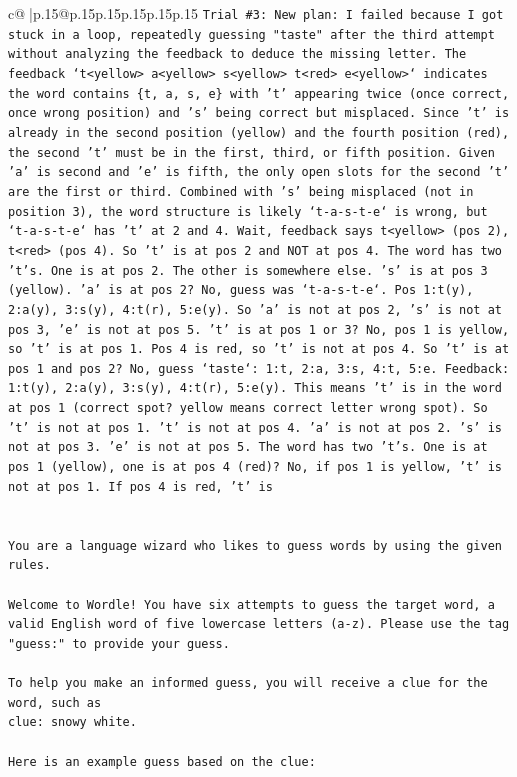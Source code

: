 \documentclass{article}
\begin{document}
{\begin{supertabular}{c@{$\;$}|p{.15\linewidth}@{}p{.15\linewidth}p{.15\linewidth}p{.15\linewidth}p{.15\linewidth}p{.15\linewidth}}
{{{\texttt{Trial \#3: New plan: I failed because I got stuck in a loop, repeatedly guessing "taste" after the third attempt without analyzing the feedback to deduce the missing letter. The feedback `t<yellow> a<yellow> s<yellow> t<red> e<yellow>` indicates the word contains \{t, a, s, e\} with 't' appearing twice (once correct, once wrong position) and 's' being correct but misplaced. Since 't' is already in the second position (yellow) and the fourth position (red), the second 't' must be in the first, third, or fifth position. Given 'a' is second and 'e' is fifth, the only open slots for the second 't' are the first or third. Combined with 's' being misplaced (not in position 3), the word structure is likely `t{-}a{-}s{-}t{-}e` is wrong, but `t{-}a{-}s{-}t{-}e` has 't' at 2 and 4. Wait, feedback says t<yellow> (pos 2), t<red> (pos 4). So 't' is at pos 2 and NOT at pos 4. The word has two 't's. One is at pos 2. The other is somewhere else. 's' is at pos 3 (yellow). 'a' is at pos 2? No, guess was `t{-}a{-}s{-}t{-}e`. Pos 1:t(y), 2:a(y), 3:s(y), 4:t(r), 5:e(y). So 'a' is not at pos 2, 's' is not at pos 3, 'e' is not at pos 5. 't' is at pos 1 or 3? No, pos 1 is yellow, so 't' is at pos 1. Pos 4 is red, so 't' is not at pos 4. So 't' is at pos 1 and pos 2? No, guess `taste`: 1:t, 2:a, 3:s, 4:t, 5:e. Feedback: 1:t(y), 2:a(y), 3:s(y), 4:t(r), 5:e(y). This means 't' is in the word at pos 1 (correct spot? yellow means correct letter wrong spot). So 't' is not at pos 1. 't' is not at pos 4. 'a' is not at pos 2. 's' is not at pos 3. 'e' is not at pos 5. The word has two 't's. One is at pos 1 (yellow), one is at pos 4 (red)? No, if pos 1 is yellow, 't' is not at pos 1. If pos 4 is red, 't' is} \\
\\ 
\\ 
\texttt{You are a language wizard who likes to guess words by using the given rules.} \\
\\ 
\texttt{Welcome to Wordle! You have six attempts to guess the target word, a valid English word of five lowercase letters (a{-}z). Please use the tag "guess:" to provide your guess.} \\
\\ 
\texttt{To help you make an informed guess, you will receive a clue for the word, such as} \\
\texttt{clue: snowy white.} \\
\\ 
\texttt{Here is an example guess based on the clue: } \\
}}}
\end{supertabular}}
\end{document}
